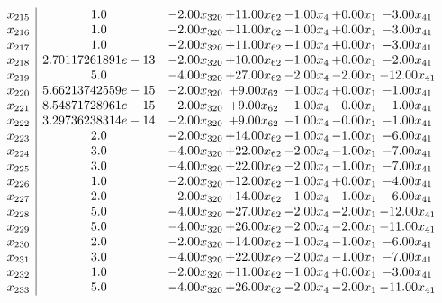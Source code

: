 \documentclass[8pt]{article}
\begin{document}
\[\begin{array}{c| c c@{\hskip 2pt} c@{\hskip 2pt} c@{\hskip 2pt} c@{\hskip 2pt} c@{\hskip 2pt} }
 x_{215}   &  1.0 & -2.00 x_{320} & + 11.00 x_{62} & -1.00 x_{4} & +  0.00 x_{1} & -3.00 x_{41}\\
 x_{216}   &  1.0 & -2.00 x_{320} & + 11.00 x_{62} & -1.00 x_{4} & +  0.00 x_{1} & -3.00 x_{41}\\
 x_{217}   &  1.0 & -2.00 x_{320} & + 11.00 x_{62} & -1.00 x_{4} & +  0.00 x_{1} & -3.00 x_{41}\\
 x_{218}   &  2.70117261891e-13 & -2.00 x_{320} & + 10.00 x_{62} & -1.00 x_{4} & +  0.00 x_{1} & -2.00 x_{41}\\
 x_{219}   &  5.0 & -4.00 x_{320} & + 27.00 x_{62} & -2.00 x_{4} & -2.00 x_{1} & -12.00 x_{41}\\
 x_{220}   &  5.66213742559e-15 & -2.00 x_{320} & +  9.00 x_{62} & -1.00 x_{4} & +  0.00 x_{1} & -1.00 x_{41}\\
 x_{221}   &  8.54871728961e-15 & -2.00 x_{320} & +  9.00 x_{62} & -1.00 x_{4} & -0.00 x_{1} & -1.00 x_{41}\\
 x_{222}   &  3.29736238314e-14 & -2.00 x_{320} & +  9.00 x_{62} & -1.00 x_{4} & -0.00 x_{1} & -1.00 x_{41}\\
 x_{223}   &  2.0 & -2.00 x_{320} & + 14.00 x_{62} & -1.00 x_{4} & -1.00 x_{1} & -6.00 x_{41}\\
 x_{224}   &  3.0 & -4.00 x_{320} & + 22.00 x_{62} & -2.00 x_{4} & -1.00 x_{1} & -7.00 x_{41}\\
 x_{225}   &  3.0 & -4.00 x_{320} & + 22.00 x_{62} & -2.00 x_{4} & -1.00 x_{1} & -7.00 x_{41}\\
 x_{226}   &  1.0 & -2.00 x_{320} & + 12.00 x_{62} & -1.00 x_{4} & +  0.00 x_{1} & -4.00 x_{41}\\
 x_{227}   &  2.0 & -2.00 x_{320} & + 14.00 x_{62} & -1.00 x_{4} & -1.00 x_{1} & -6.00 x_{41}\\
 x_{228}   &  5.0 & -4.00 x_{320} & + 27.00 x_{62} & -2.00 x_{4} & -2.00 x_{1} & -12.00 x_{41}\\
 x_{229}   &  5.0 & -4.00 x_{320} & + 26.00 x_{62} & -2.00 x_{4} & -2.00 x_{1} & -11.00 x_{41}\\
 x_{230}   &  2.0 & -2.00 x_{320} & + 14.00 x_{62} & -1.00 x_{4} & -1.00 x_{1} & -6.00 x_{41}\\
 x_{231}   &  3.0 & -4.00 x_{320} & + 22.00 x_{62} & -2.00 x_{4} & -1.00 x_{1} & -7.00 x_{41}\\
 x_{232}   &  1.0 & -2.00 x_{320} & + 11.00 x_{62} & -1.00 x_{4} & +  0.00 x_{1} & -3.00 x_{41}\\
 x_{233}   &  5.0 & -4.00 x_{320} & + 26.00 x_{62} & -2.00 x_{4} & -2.00 x_{1} & -11.00 x_{41}\\

\end{array}\]
\end{document}
